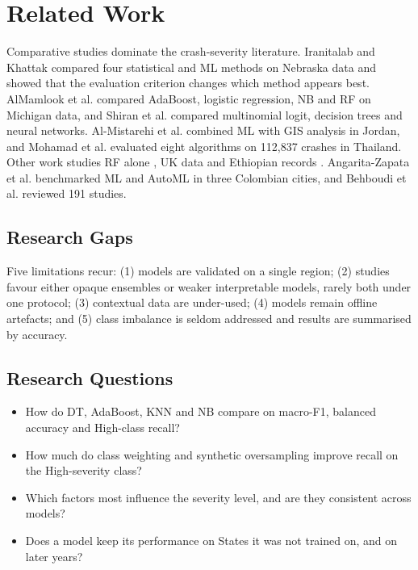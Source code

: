 \documentclass[conference]{IEEEtran}
\begin{document}
\section{Related Work}
\label{sec:related}

Comparative studies dominate the crash-severity literature. Iranitalab and Khattak \cite{iranitalab2017} compared four statistical and ML methods on Nebraska data and showed that the evaluation criterion changes which method appears best. AlMamlook et al. \cite{almamlook2019} compared AdaBoost, logistic regression, NB and RF on Michigan data, and Shiran et al. \cite{shiran2021} compared multinomial logit, decision trees and neural networks. Al-Mistarehi et al. \cite{almistarehi2022} combined ML with GIS analysis in Jordan, and Mohamad et al. \cite{mohamad2025} evaluated eight algorithms on 112,837 crashes in Thailand. Other work studies RF alone \cite{hoanglong2021}, UK data \cite{vanitha2023} and Ethiopian records \cite{ethiopia2025}. Angarita-Zapata et al. \cite{angarita2021} benchmarked ML and AutoML in three Colombian cities, and Behboudi et al. \cite{behboudi2024} reviewed 191 studies.

\subsection{Research Gaps}
Five limitations recur: (1) models are validated on a single region; (2) studies favour either opaque ensembles or weaker interpretable models, rarely both under one protocol; (3) contextual data are under-used; (4) models remain offline artefacts; and (5) class imbalance is seldom addressed and results are summarised by accuracy.

\subsection{Research Questions}
\begin{itemize}
\item[RQ1] How do DT, AdaBoost, KNN and NB compare on macro-F1, balanced accuracy and High-class recall?
\item[RQ2] How much do class weighting and synthetic oversampling improve recall on the High-severity class?
\item[RQ3] Which factors most influence the severity level, and are they consistent across models?
\item[RQ4] Does a model keep its performance on States it was not trained on, and on later years?
\end{itemize}
\end{document}
